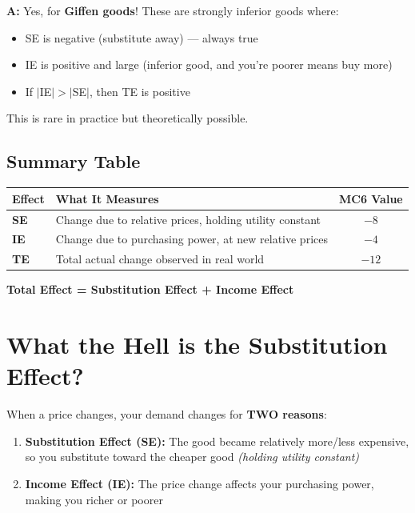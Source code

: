 \documentclass[11pt]{article}
\begin{document}
\textbf{A:} Yes, for \textbf{Giffen goods}! These are strongly inferior goods where:
\begin{itemize}
    \item SE is negative (substitute away) — always true
    \item IE is positive and large (inferior good, and you're poorer means buy more)
    \item If $|$IE$| > |$SE$|$, then TE is positive
\end{itemize}

This is rare in practice but theoretically possible.

\subsection{Summary Table}

\begin{center}
\begin{tabular}{|l|p{6cm}|c|}
\hline
\textbf{Effect} & \textbf{What It Measures} & \textbf{MC6 Value} \\
\hline
\textbf{SE} & Change due to relative prices, holding utility constant & $-8$ \\
\hline
\textbf{IE} & Change due to purchasing power, at new relative prices & $-4$ \\
\hline
\textbf{TE} & Total actual change observed in real world & $-12$ \\
\hline
\end{tabular}
\end{center}

\vspace{1em}

\begin{center}
\colorbox{blue!10}{
\Large
\textbf{Total Effect = Substitution Effect + Income Effect}
}
\end{center}

\newpage

\section{What the Hell is the Substitution Effect?}

When a price changes, your demand changes for \textbf{TWO reasons}:

\begin{enumerate}
    \item \textbf{Substitution Effect (SE):} The good became relatively more/less expensive, so you substitute toward the cheaper good \textit{(holding utility constant)}

    \item \textbf{Income Effect (IE):} The price change affects your purchasing power, making you richer or poorer
\end{enumerate}
\end{document}
